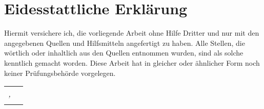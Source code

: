 \chapter*{Eidesstattliche Erkl\"arung}
\thispagestyle{empty}
Hiermit versichere ich, die vorliegende Arbeit ohne Hilfe Dritter und nur mit den angegebenen Quellen und Hilfsmitteln angefertigt zu haben. Alle Stellen, die w\"{o}rtlich oder inhaltlich aus den Quellen entnommen wurden, sind als solche kenntlich gemacht worden. Diese Arbeit hat in gleicher oder \"{a}hnlicher Form noch keiner Pr\"{u}fungsbeh\"{o}rde vorgelegen.
\bigskip
\smallskip

\begin{tabular}{m{7.5cm}m{5cm}}
	\noindent\textit{\myLocation, \IfLanguageName{ngerman}{\myTimede}{\myTimeen}} &  \\ 
	\cline{2-2}
	& \centering\myName \\
\end{tabular}





